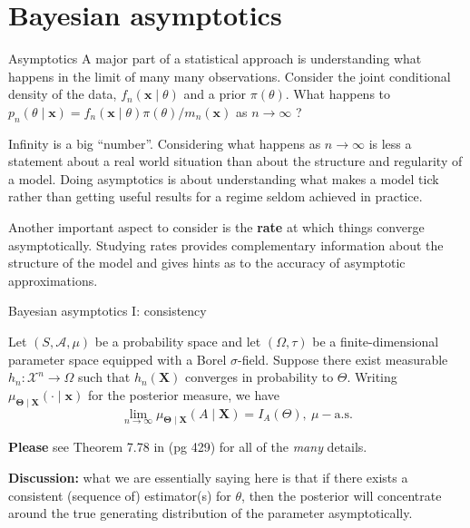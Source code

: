 \section*{Bayesian asymptotics}
\begin{frame}{Asymptotics}
A major part of a statistical approach is understanding what happens in the limit of many many observations.
Consider the joint conditional density of the data, $f_n(\boldsymbol{x} \mid \theta)$ and a prior $\pi(\theta)$.
What happens to $p_n(\theta \mid \boldsymbol{x}) = f_n(\boldsymbol{x} \mid \theta)\pi(\theta)/m_n(\boldsymbol{x})$ as $n \to \infty$ ?
\begin{idea}
 Infinity is a big ``number''.
 Considering what happens  as $n \to \infty$ is less a statement about a real world situation than about the structure and regularity of a model.
 Doing asymptotics is about understanding what makes a model tick rather than getting useful results for a regime seldom achieved in practice.
\end{idea}
Another important aspect to consider is the \textbf{rate} at which things converge asymptotically.
Studying rates provides complementary information about the structure of the model and gives hints as to the accuracy of asymptotic approximations.
 \end{frame}
\begin{frame}{Bayesian asymptotics I: consistency}
\begin{theo}
Let $(S, \mathcal{A}, \mu)$ be a probability space and let $(\Omega, \tau)$ be a finite-dimensional parameter space equipped with a Borel $\sigma$-field.
Suppose there exist measurable $h_n: \mathcal{X}^n \to \Omega$ such that $h_n(\boldsymbol{X})$ converges in probability to $\Theta$.
Writing $\mu_{\boldsymbol{\Theta} \mid \boldsymbol{X}}(\cdot \mid \boldsymbol{x})$ for the posterior measure, we have
\begin{equation*}
 \lim_{n \to \infty} \mu_{\boldsymbol{\Theta} \mid \boldsymbol{X}}(A \mid \boldsymbol{X}) = I_A(\Theta), \: \mu-\textrm{a.s.}
\end{equation*}
\end{theo}
\textbf{Please} see Theorem 7.78 in \cite{Schervish1995} (pg 429) for all of the \textit{many} details.

\textbf{Discussion:} what we are essentially saying here is that if there exists a consistent (sequence of) estimator(s) for $\theta$, then the posterior will concentrate around the true generating distribution of the parameter asymptotically.
\end{frame}
